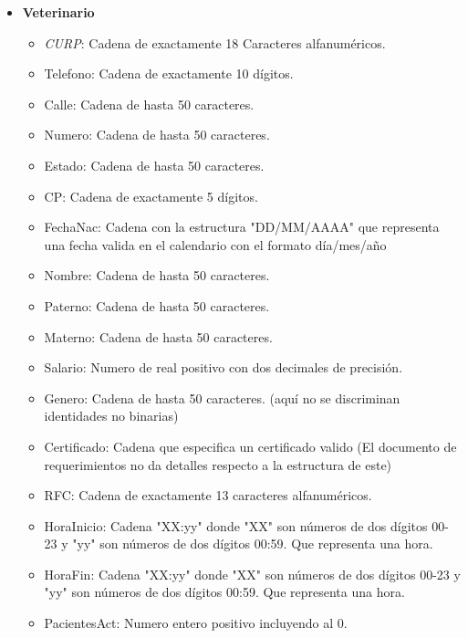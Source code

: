 \documentclass{exam}
\begin{document}
\begin{itemize}
	\item \textbf{Veterinario}
		\begin{itemize}
			\item \textit{CURP}: Cadena de exactamente 18 Caracteres alfanuméricos.
			\item Telefono: Cadena de exactamente 10 dígitos.
			\item Calle: Cadena de hasta 50 caracteres.
			\item Numero: Cadena de hasta 50 caracteres.
			\item Estado: Cadena de hasta 50 caracteres.
			\item CP: Cadena de exactamente 5 dígitos.
			\item FechaNac: Cadena con la estructura "DD/MM/AAAA" que representa una fecha valida en el calendario con el formato día/mes/año
			\item Nombre: Cadena de hasta 50 caracteres.
			\item Paterno: Cadena de hasta 50 caracteres.
			\item Materno: Cadena de hasta 50 caracteres.
			\item Salario: Numero de real positivo con dos decimales de precisión.
			\item Genero: Cadena de hasta 50 caracteres. (aquí no se discriminan identidades no binarias)
			\item Certificado: Cadena que especifica un certificado valido (El documento de requerimientos no da detalles respecto a la estructura de este)
			\item RFC: Cadena de exactamente 13 caracteres alfanuméricos.
			\item HoraInicio: Cadena "XX:yy" donde "XX" son números de dos dígitos 00-23 y "yy" son números de dos dígitos 00:59. Que representa una hora.
			\item HoraFin: Cadena "XX:yy" donde "XX" son números de dos dígitos 00-23 y "yy" son números de dos dígitos 00:59. Que representa una hora.
			\item PacientesAct: Numero entero positivo incluyendo al 0.
		\end{itemize}
		

\end{itemize}
\end{document}
